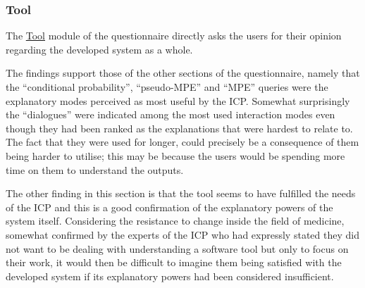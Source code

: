 \subsubsection{Tool}
The \hyperref[ques:tool]{Tool} module of the questionnaire directly asks the users for their opinion regarding the developed system as a whole.

The findings support those of the other sections of the questionnaire, namely that the \enquote{conditional probability}, \enquote{pseudo-MPE} and \enquote{MPE} queries were the explanatory modes perceived as most useful by the ICP.
Somewhat surprisingly the \enquote{dialogues} were indicated among the most used interaction modes even though they had been ranked as the explanations that were hardest to relate to.
The fact that they were used for longer, could precisely be a consequence of them being harder to utilise; this may be because the users would be spending more time on them to understand the outputs.

The other finding in this section is that the tool seems to have fulfilled the needs of the ICP and this is a good confirmation of the explanatory powers of the system itself.
Considering the resistance to change inside the field of medicine, somewhat confirmed by the experts of the ICP who had expressly stated they did not want to be dealing with understanding a software tool but only to focus on their work, it would then be difficult to imagine them being satisfied with the developed system if its explanatory powers had been considered insufficient.

